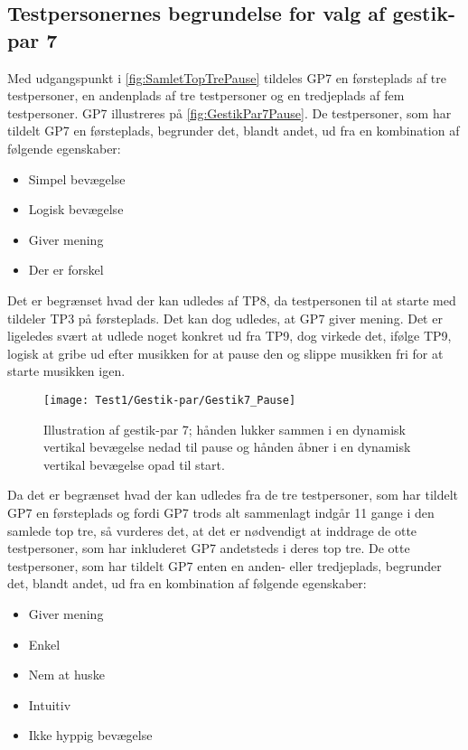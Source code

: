 \subsection{Testpersonernes begrundelse for valg af gestik-par 7}
\label{TestresultaterValgAfGestikkerBegrundelseGP7}
%
Med udgangspunkt i \autoref{fig:SamletTopTrePause} tildeles GP7 en førsteplads af tre testpersoner, en andenplads af tre testpersoner og en tredjeplads af fem testpersoner. GP7 illustreres på \autoref{fig:GestikPar7Pause}. De testpersoner, som har tildelt GP7 en førsteplads, begrunder det, blandt andet, ud fra en kombination af følgende egenskaber: 
%
\begin{multicols}{3}
    \begin{itemize}
        \item Simpel bevægelse
        \item Logisk bevægelse
        \item Giver mening
        \item Der er forskel 
\end{itemize}
\end{multicols}
\noindent
%
Det er begrænset hvad der kan udledes af TP8, da testpersonen til at starte med tildeler TP3 på førsteplads. Det kan dog udledes, at GP7 giver mening. Det er ligeledes svært at udlede noget konkret ud fra TP9, dog virkede det, ifølge TP9, logisk at gribe ud efter musikken for at pause den og slippe musikken fri for at starte musikken igen.
%
\begin{figure}[H]
	\centering
	\texttt{[image: Test1/Gestik-par/Gestik7\_Pause]}
	\caption{Illustration af gestik-par 7; hånden lukker sammen i en dynamisk vertikal bevægelse nedad til pause og hånden åbner i en dynamisk vertikal bevægelse opad til start.}
	\label{fig:GestikPar7Pause}
\end{figure}
\noindent
%
Da det er begrænset hvad der kan udledes fra de tre testpersoner, som har tildelt GP7 en førsteplads og fordi GP7 trods alt sammenlagt indgår 11 gange i den samlede top tre, så vurderes det, at det er nødvendigt at inddrage de otte testpersoner, som har inkluderet GP7 andetsteds i deres top tre. De otte testpersoner, som har tildelt GP7 enten en anden- eller tredjeplads, begrunder det, blandt andet, ud fra en kombination af følgende egenskaber: 
%
\begin{multicols}{3}
    \begin{itemize}
        \item Giver mening
        \item Enkel
        \item Nem at huske
        \item Intuitiv
        \item Ikke hyppig bevægelse
\end{itemize}
\end{multicols}
